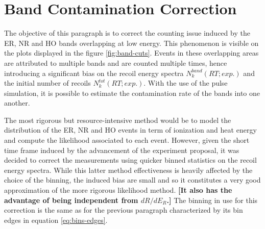 

\section{Band Contamination Correction}

The objective of this paragraph is to correct the counting issue induced by the ER, NR and HO bands overlapping at low energy. This phenomenon is visible on the plots displayed in the figure \ref{fig:band-cuts}. Events in these overlapping areas are attributed to multiple bands and are counted multiple times, hence introducing a significant bias on the recoil energy spectra $N_k^{band} (RT; exp.)$ and the initial number of recoils $N_k^{tot} (RT; exp.)$. With the use of the pulse simulation, it is possible to estimate the contamination rate of the bands into one another.

The most rigorous but resource-intensive method would be to model the distribution of the ER, NR and HO events in term of ionization and heat energy and compute the likelihood associated to each event. However, given the short time frame induced by the advancement of the \Ricochet{} experiment proposal, it was decided to correct the measurements using quicker binned statistics on the recoil energy spectra. While this latter method effectiveness is heavily affected by the choice of the binning, the induced bias are small and so it constitutes a very good approximation of the more rigorous likelihood method.
\textbf{ [It also has the advantage of being independent from $dR/dE_R$.] }
 The binning in use for this correction is the same as for the previous paragraph characterized by its bin edges in equation \ref{eq:bins-edges}.

